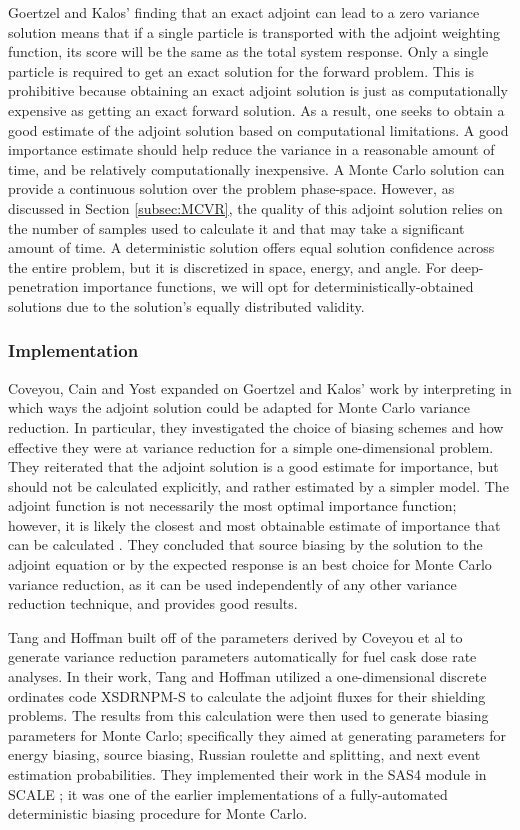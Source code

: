Goertzel and Kalos' finding that an exact adjoint can lead to a zero variance
solution means that if a single particle is transported with the adjoint
weighting function, its score will be the same as the total system response.
Only a single particle is required to get an exact solution for the forward
problem. This is prohibitive because obtaining
an exact adjoint solution is just as computationally expensive as getting
an exact forward solution. As a result, one seeks to obtain a good estimate of the
adjoint solution based on computational limitations. A good importance estimate
should help reduce the variance in a reasonable amount of time, and be
relatively computationally inexpensive. A Monte Carlo solution can
provide a continuous solution over the problem phase-space. However, as
discussed in Section \ref{subsec:MCVR}, the quality of this adjoint solution
relies on the number of samples used to calculate it and that may take a
significant amount of time. A deterministic solution
offers equal solution confidence across the entire problem, but it is
discretized
in space, energy, and angle. For deep-penetration importance functions, we will
opt for deterministically-obtained solutions due to the solution's equally
distributed validity.

\subsubsection{Implementation}

Coveyou, Cain and Yost \cite{coveyou_adjoint_1967} expanded on Goertzel and
Kalos' work by interpreting in which ways the adjoint solution could be adapted
for Monte Carlo variance reduction. In particular, they investigated the choice
of biasing schemes and how effective they were at variance reduction for a
simple one-dimensional problem. They reiterated that the adjoint solution is a
good estimate for importance, but should not be calculated explicitly, and
rather estimated by a simpler model. The adjoint function is not necessarily the
most optimal importance function; however, it is likely the closest and most
obtainable estimate of importance that can be calculated
\cite{coveyou_adjoint_1967}. They
concluded that source biasing by the solution to the adjoint equation or by the
expected response is an best choice for Monte Carlo variance reduction, as it
can be used independently of any other variance reduction technique, and
provides good results.

Tang and Hoffman \cite{tang_monte_1988} built off of the parameters derived by
Coveyou et al \cite{coveyou_adjoint_1967} to generate variance reduction
parameters automatically for fuel cask dose rate analyses. In their work, Tang
and Hoffman utilized a one-dimensional discrete ordinates code XSDRNPM-S to
calculate the adjoint fluxes for their shielding problems. The results from this
calculation were then used to generate biasing parameters for Monte Carlo;
specifically they aimed at generating parameters for energy biasing, source
biasing, Russian roulette and splitting, and next event estimation
probabilities. They implemented their work in the SAS4 module in SCALE
\cite{SCALE6_1}; it was
one of the earlier implementations of a fully-automated deterministic
biasing procedure for Monte Carlo.

